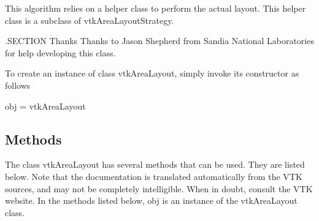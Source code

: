 This algorithm relies on a helper class to perform the actual layout. This helper class is a subclass of vtk\-Area\-Layout\-Strategy.

.S\-E\-C\-T\-I\-O\-N Thanks Thanks to Jason Shepherd from Sandia National Laboratories for help developing this class.

To create an instance of class vtk\-Area\-Layout, simply invoke its constructor as follows \begin{DoxyVerb}  obj = vtkAreaLayout
\end{DoxyVerb}
 \hypertarget{vtkwidgets_vtkxyplotwidget_Methods}{}\subsection{Methods}\label{vtkwidgets_vtkxyplotwidget_Methods}
The class vtk\-Area\-Layout has several methods that can be used. They are listed below. Note that the documentation is translated automatically from the V\-T\-K sources, and may not be completely intelligible. When in doubt, consult the V\-T\-K website. In the methods listed below, {\ttfamily obj} is an instance of the vtk\-Area\-Layout class. 
